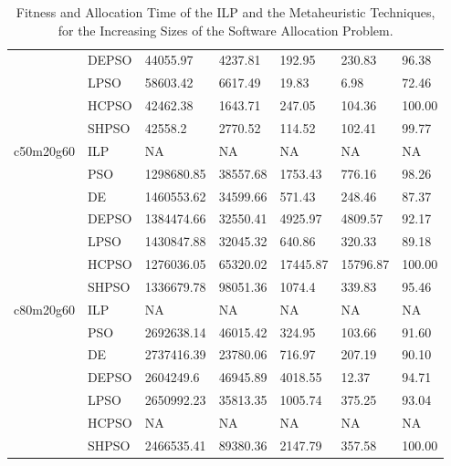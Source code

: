 \begin{table}[]
\begin{tabular}{@{}lllllll@{}}
 & DEPSO & 44055.97 & 4237.81 & 192.95 & 230.83 & 96.38  \\
 & LPSO & 58603.42 & 6617.49 & 19.83 & 6.98 & 72.46  \\
 & HCPSO & 42462.38 & 1643.71 & 247.05 & 104.36 & 100.00  \\
 & SHPSO & 42558.2 & 2770.52 & 114.52 & 102.41 & 99.77  \\
c50m20g60 & ILP & NA & NA & NA & NA & NA \\
 & PSO & 1298680.85 & 38557.68 & 1753.43 & 776.16 & 98.26  \\
 & DE & 1460553.62 & 34599.66 & 571.43 & 248.46 & 87.37  \\
 & DEPSO & 1384474.66 & 32550.41 & 4925.97 & 4809.57 & 92.17  \\
 & LPSO & 1430847.88 & 32045.32 & 640.86 & 320.33 & 89.18  \\
 & HCPSO & 1276036.05 & 65320.02 & 17445.87 & 15796.87 & 100.00  \\
 & SHPSO & 1336679.78 & 98051.36 & 1074.4 & 339.83 & 95.46  \\
c80m20g60 & ILP & NA & NA & NA & NA & NA \\
 & PSO & 2692638.14 & 46015.42 & 324.95 & 103.66 & 91.60  \\
 & DE & 2737416.39 & 23780.06 & 716.97 & 207.19 & 90.10  \\
 & DEPSO & 2604249.6 & 46945.89 & 4018.55 & 12.37 & 94.71  \\
 & LPSO & 2650992.23 & 35813.35 & 1005.74 & 375.25 & 93.04  \\
 & HCPSO & NA & NA & NA & NA & NA \\
 & SHPSO & 2466535.41 & 89380.36 & 2147.79 & 357.58 & 100.00  \\ \bottomrule
\end{tabular}
\caption{Fitness and Allocation Time of the ILP and the Metaheuristic Techniques, for the Increasing Sizes of the Software Allocation Problem.}
\label{tbl_fitness_allocationtime_ilp_plus_metaheuristic}
\end{table}